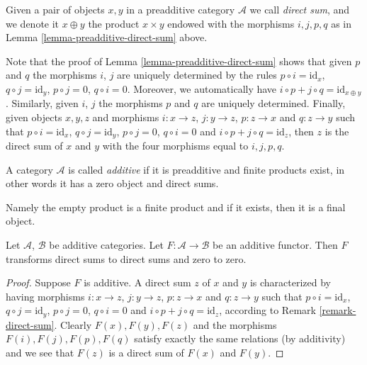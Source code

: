 \begin{definition}
\label{definition-direct-sum}
Given a pair of objects $x, y$
in a preadditive category $\mathcal{A}$ we call
{\it direct sum}, and we denote it $x \oplus y$ the
product $x \times y$ endowed with the morphisms
$i, j, p, q$ as in Lemma \ref{lemma-preadditive-direct-sum} above.
\end{definition}

\begin{remark}
\label{remark-direct-sum}
Note that the proof of Lemma \ref{lemma-preadditive-direct-sum}
shows that given $p$ and $q$ the morphisms $i$, $j$ are uniquely
determined by the rules $p \circ i = \text{id}_x$,
$q \circ j = \text{id}_y$, $p \circ j = 0$, $q \circ i = 0$.
Moreover, we automatically have
$i \circ p + j \circ q = \text{id}_{x \oplus y}$.
Similarly, given $i$, $j$ the morphisms $p$ and $q$ are uniquely determined.
Finally, given objects $x, y, z$ and morphisms
$i : x \to z$, $j : y \to z$, $p : z \to x$ and
$q : z \to y$ such that $p \circ i = \text{id}_x$,
$q \circ j = \text{id}_y$, $p \circ j = 0$, $q \circ i = 0$
and $i \circ p + j \circ q = \text{id}_{z}$, then $z$
is the direct sum of $x$ and $y$ with the four morphisms
equal to $i, j, p, q$.
\end{remark}

\begin{definition}
\label{definition-additive-category}
A category $\mathcal{A}$ is called {\it additive}
if it is preadditive and finite products exist, in other
words it has a zero object and direct sums.
\end{definition}

\noindent
Namely the empty product is a finite product and
if it exists, then it is a final object.

\begin{lemma}
\label{lemma-additive-additive}
Let $\mathcal{A}$, $\mathcal{B}$ be additive categories.
Let $F : \mathcal{A} \to \mathcal{B}$ be an additive functor.
Then $F$ transforms direct sums to direct sums and zero to zero.
\end{lemma}

\begin{proof}
Suppose $F$ is additive. A direct sum $z$
of $x$ and $y$ is characterized by having morphisms
$i : x \to z$, $j : y \to z$, $p : z \to x$ and
$q : z \to y$ such that $p \circ i = \text{id}_x$,
$q \circ j = \text{id}_y$, $p \circ j = 0$, $q \circ i = 0$
and $i \circ p + j \circ q = \text{id}_{z}$, according
to Remark \ref{remark-direct-sum}. Clearly $F(x), F(y), F(z)$
and the morphisms $F(i), F(j), F(p), F(q)$ satisfy exactly the
same relations (by additivity) and we see that $F(z)$ is
a direct sum of $F(x)$ and $F(y)$.
\end{proof}


